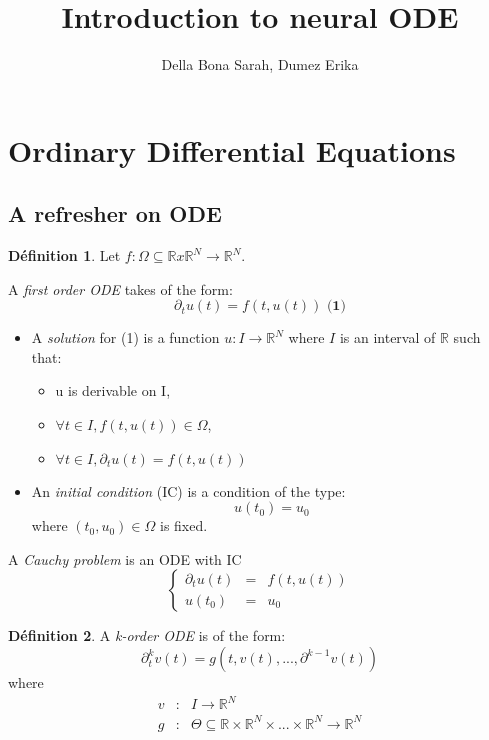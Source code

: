 \documentclass[10pt,a4paper]{article}
\author{Della Bona Sarah, Dumez Erika}
\title{Introduction to neural ODE}
\theoremstyle{definition}
\newtheorem{definition}{Définition}
\theoremstyle{theorem}
\begin{document}
\maketitle
 
 
\section{Ordinary Differential Equations}

\subsection{A refresher on ODE}

\begin{definition}
Let $f: \Omega \subseteq \mathbb{R} x \mathbb{R}^N \rightarrow \mathbb{R}^N$. 

A \textit{first order ODE} takes of the form:
\[
\partial_t u(t) = f(t,u(t)) \textbf{   (1)}
\]

\begin{itemize}
\item A \textit{solution} for (1) is a function $u : I \rightarrow \mathbb{R}^N$ where $I$ is an interval of $\mathbb{R}$ such that:
	\begin{itemize}
	\item u is derivable on I,
	\item $\forall t \in I, f(t, u(t)) \in \Omega$,
	\item $\forall t \in I, \partial_t u(t) = f(t, u(t))$
	\end{itemize}
\item An \textit{initial condition} (IC) is a condition of the type:
\[
u(t_0) = u_0
\]
where $(t_0, u_0) \in \Omega$ is fixed.
\end{itemize}
\item A \textit{Cauchy problem} is an ODE with IC
\[
\left \{
\begin{array}{rcl}
\partial_t u(t) & = & f(t, u(t)) \\
u(t_0) & = & u_0
\end{array}
\right.
\]
\end{definition}

\begin{definition}
A \textit{k-order ODE} is of the form:
\[
\partial^k_t v(t) = g(t, v(t), ... , \partial^{k-1}v(t))
\]
where 
   \begin{eqnarray}
   \nonumber
   v & : & I \rightarrow \mathbb{R}^N \\ 
   \nonumber
   g & : & \Theta \subseteq \mathbb{R} \times \mathbb{R}^N \times ... \times \mathbb{R}^N \rightarrow \mathbb{R}^N
   \end{eqnarray}
\end{definition}
\end{document}
